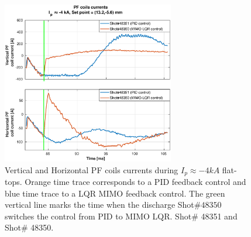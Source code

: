 \begin{figure}
	\centering
	\includegraphics[width=0.67\textwidth]{Chp5/PIDvsMIMO_351_350_curr_2.eps}
	\caption{Vertical and Horizontal PF coils currents during  $I_p\approx -4kA$  flat-tops. Orange time trace corresponds to a PID feedback control and blue time trace to a LQR MIMO feedback control. The green vertical line marks the time  when the  discharge Shot$\# 48350$ switches the control from PID to MIMO LQR.  Shot$\#$ 48351 and Shot$\#$ 48350.}
\end{figure}